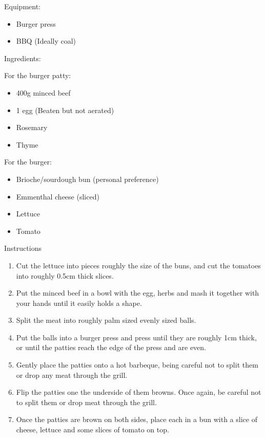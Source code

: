 \documentclass[a4paper, oneside]{book}
\begin{document}
\begin{multicols}{2}
        Equipment:
        {\begin{itemize}
            \item Burger press
            \item BBQ (Ideally coal)
        \end{itemize}}
        Ingredients:

        For the burger patty:
        {\begin{itemize}
            \item 400g minced beef
            \item 1 egg (Beaten but not aerated)
            \item Rosemary
            \item Thyme
        \end{itemize}}
        For the burger:
        {\begin{itemize}
            \item Brioche/sourdough bun (personal preference)
            \item Emmenthal cheese (sliced)
            \item Lettuce
            \item Tomato
        \end{itemize}}
    Instructions
    {\begin{enumerate}
        \item
            Cut the lettuce into pieces roughly the size of the buns, and cut
            the tomatoes into roughly 0.5cm thick slices.
        \item 
            Put the minced beef in a bowl with the egg, herbs and mash it
            together with your hands until it easily holds a shape.
        \item
            Split the meat into roughly palm sized evenly sized balls.
        \item
            Put the balls into a burger press and press until they are roughly
            1cm thick, or until the patties reach the edge of the press and are
            even.
        \item
            Gently place the patties onto a hot barbeque, being careful not to
            split them or drop any meat through the grill.
        \item
            Flip the patties one the underside of them browns. Once again, be
            careful not to split them or drop meat through the grill.
        \item 
            Once the patties are brown on both sides, place each in a bun with
            a slice of cheese, lettuce and some slices of tomato on top.
    \end{enumerate}}

\end{multicols}
\end{document}
